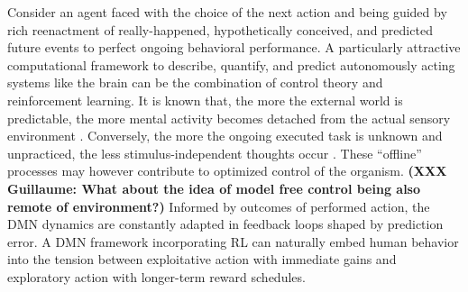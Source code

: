 \documentclass[10pt,letterpaper]{article}
\begin{document}
Consider an agent faced with the choice of the next action
and being guided by rich
reenactment of really-happened, hypothetically conceived, and
predicted future events to perfect ongoing behavioral performance.
A particularly attractive computational framework
to describe, quantify, and predict autonomously acting systems like the brain
can be the combination of control theory and reinforcement learning.
It is known that, the more the external world is predictable,
the more mental activity becomes detached from the actual sensory environment
\citep{antrobus1966studies, pope1978regulation}.
Conversely,
the more the ongoing executed task is unknown and unpracticed,
the less stimulus-independent thoughts occur
\citep{filler1973daydreaming, teasdale1995stimulus}.
These ``offline'' processes may however contribute to optimized control of the organism. \textbf{(XXX Guillaume: What about the idea of model free control being also remote of environment?)}
Informed by outcomes of performed action,
the DMN dynamics are constantly adapted in feedback loops
shaped by prediction error.
A DMN framework incorporating RL can naturally embed human behavior
into the tension between exploitative action with immediate gains and
exploratory action with longer-term reward schedules.
\end{document}
